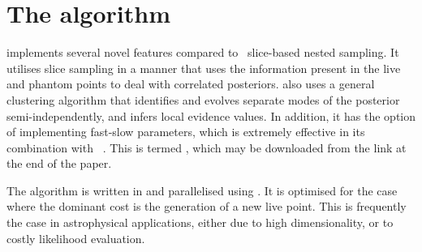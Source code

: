 \section{The \PolyChord{} algorithm}
\label{sec:pc:polychord_algorithm}

\PolyChord{} implements several novel features compared to~ slice-based nested sampling.  
It utilises slice sampling in a manner that uses the information present in the live and phantom points to deal with correlated posteriors. 
\PolyChord{} also uses a general clustering algorithm that identifies and evolves separate modes of the posterior semi-independently, and infers local evidence values.  
In addition, it has the option of implementing fast-slow parameters, which is extremely effective in its combination with \CosmoMC{}~\citep{cosmomc}. 
This is termed \CosmoChord, which may be downloaded from the link at the end of the paper.

 The algorithm is written in \FORTRAN{} and parallelised using \openMPI{}.  It is optimised for the case where the dominant cost is the generation of a new live point.  This is frequently the case in astrophysical applications, either due to high dimensionality, or to costly likelihood evaluation.  

